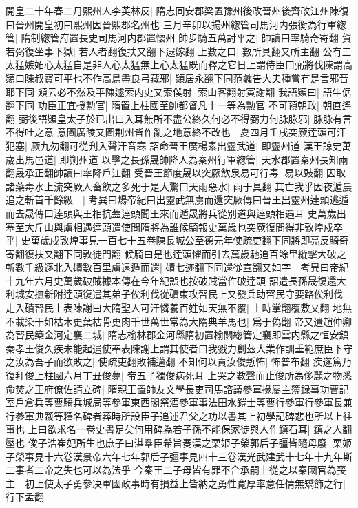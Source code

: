 開皇二十年春二月熙州人李英林反|{
	隋志同安郡梁置豫州後改晉州後齊改江州陳復曰晉州開皇初曰熙州因晉熙郡名州也}
三月辛卯以揚州緫管司馬河内張衡為行軍緫管|{
	隋制緫管府置長史司馬河内郡置懷州}
帥步騎五萬討平之|{
	帥讀曰率騎奇寄翻}
賀若弼復坐事下獄|{
	若人者翻復扶又翻下遐嫁翻}
上數之曰|{
	數所具翻又所主翻}
公有三太猛嫉妬心太猛自是非人心太猛無上心太猛既而釋之它日上謂侍臣曰弼將伐陳謂高熲曰陳叔寶可平也不作高鳥盡良弓藏邪|{
	熲居永翻下同范蠡告大夫種嘗有是言邪音耶下同}
熲云必不然及平陳遽索内史又索僕射|{
	索山客翻射寅謝翻}
我語熲曰|{
	語牛倨翻下同}
功臣正宜授勲官|{
	隋置上柱國至帥都督凡十一等為勲官}
不可預朝政|{
	朝直遙翻}
弼後語熲皇太子於已出口入耳無所不盡公終久何必不得弼力何脉脉邪|{
	脉脉有言不得吐之意}
意圖廣陵又圖荆州皆作亂之地意終不改也　夏四月壬戌突厥逹頭可汗犯塞|{
	厥九勿翻可從刋入聲汗音寒}
詔命晉王廣楊素出靈武道|{
	即靈州道}
漢王諒史萬歲出馬邑道|{
	即朔州道}
以擊之長孫晟帥降人為秦州行軍緫管|{
	天水郡置秦州長知兩翻晟承正翻帥讀曰率降戶江翻}
受晉王節度晟以突厥飲泉易可行毒|{
	易以䜴翻}
因取諸藥毒水上流突厥人畜飲之多死于是大驚曰天雨惡水|{
	雨于具翻}
其亡我乎因夜遁晨追之斬首千餘級　|{
	考異曰煬帝紀曰出靈武無虜而還突厥傳曰晉王出靈州逹頭逃遁而去晟傳曰逹頭與王相抗蓋逹頭聞王來而遁晟將兵從别道與逹頭相遇耳}
史萬歲出塞至大斤山與虜相遇逹頭遣使問隋將為誰候騎報史萬歲也突厥復問得非敦煌戍卒乎|{
	史萬歲戍敦煌事見一百七十五卷陳長城公至德元年使疏吏翻下同將即亮反騎奇寄翻復扶又翻下同敦徒門翻}
候騎曰是也逹頭懼而引去萬歲馳追百餘里縱擊大破之斬數千級逐北入磧數百里虜遠遁而還|{
	磧七迹翻下同還從宣翻又如字　考異曰帝紀十九年六月史萬歲破賊據本傳在今年紀誤也按破賊當作破逹頭}
詔遣長孫晟復還大利城安撫新附逹頭復遣其弟子俟利伐從磧東攻唘民上又發兵助唘民守要路俟利伐走入磧唘民上表陳謝曰大隋聖人可汗憐養百姓如天無不覆|{
	上時掌翻覆敷又翻}
地無不載染干如枯木更葉枯骨更肉千世萬世常為大隋典羊馬也|{
	爲于偽翻}
帝又遣趙仲卿為唘民築金河定襄二城|{
	隋志榆林郡金河縣隋初置榆關緫管定襄即雲内縣之恒安鎮}
秦孝王俊久疾未能起遣使奉表陳謝上謂其使者曰我戮力創茲大業作訓垂範庶臣下守之汝為吾子而欲敗之|{
	使疏吏翻敗補邁翻}
不知何以責汝俊慙怖|{
	怖普布翻}
疾遂篤乃復拜俊上柱國六月丁丑俊薨|{
	帝五子獨俊病死耳}
上哭之數聲而止俊所為侈麗之物悉命焚之王府僚佐請立碑|{
	隋親王置師友文學長吏司馬諮議參軍掾屬主簿録事功曹記室戶倉兵等曹騎兵城局等參軍東西閣祭酒參軍事法田水鎧士等曹行參軍行參軍長兼行參軍典籖等釋名碑者葬時所設臣子追述君父之功以書其上初學記碑悲也所以上往事也}
上曰欲求名一卷史書足矣何用碑為若子孫不能保家徒與人作鎮石耳|{
	鎮之人翻壓也}
俊子浩崔妃所生也庶子曰湛羣臣希旨奏漢之栗姬子榮郭后子彊皆隨母廢|{
	栗姬子榮事見十六卷漢景帝六年七年郭后子彊事見四十三卷漢光武建武十七年十九年斯二事者二帝之失也可以為法乎}
今秦王二子母皆有罪不合承嗣上從之以秦國官為喪主　初上使太子勇參决軍國政事時有損益上皆納之勇性寛厚率意任情無矯飾之行|{
	行下孟翻}
